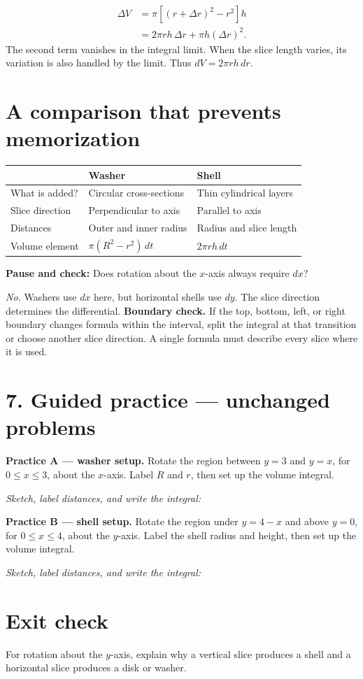 \documentclass[11pt,letterpaper]{article}
\newcommand{\topic}[1]{\section*{#1}}
\newcommand{\pauseq}[1]{\par\textbf{Pause and check:} #1\par}
\begin{document}
\begin{align*}
\Delta V&=\pi[(r+\Delta r)^2-r^2]h\\
 &=2\pi rh\,\Delta r+\pi h(\Delta r)^2.
\end{align*}
The second term vanishes in the integral limit. When the slice length varies, its variation is also handled by the limit. Thus $dV=2\pi rh\,dr$.
\topic{A comparison that prevents memorization}
\begin{center}\begin{tabular}{p{1.15in}p{2.25in}p{2.6in}}\toprule
 & Washer & Shell\\\midrule
What is added? & Circular cross-sections & Thin cylindrical layers\\[5pt]
Slice direction & Perpendicular to axis & Parallel to axis\\[5pt]
Distances & Outer and inner radius & Radius and slice length\\[5pt]
Volume element & $\pi(R^2-r^2)\,dt$ & $2\pi rh\,dt$\\\bottomrule
\end{tabular}\end{center}
\pauseq{Does rotation about the $x$-axis always require $dx$?}
\textit{No.} Washers use $dx$ here, but horizontal shells use $dy$. The slice direction determines the differential.
\textbf{Boundary check.} If the top, bottom, left, or right boundary changes formula within the interval, split the integral at that transition or choose another slice direction. A single formula must describe every slice where it is used.
\newpage
\topic{7. Guided practice --- unchanged problems}
\textbf{Practice A --- washer setup.} Rotate the region between $y=3$ and $y=x$, for $0\leq x\leq3$, about the $x$-axis. Label $R$ and $r$, then set up the volume integral.
\par\vspace{0.1in}
\textit{Sketch, label distances, and write the integral:}\par\vspace{1.1in}
\textbf{Practice B --- shell setup.} Rotate the region under $y=4-x$ and above $y=0$, for $0\leq x\leq4$, about the $y$-axis. Label the shell radius and height, then set up the volume integral.
\par\vspace{0.1in}
\textit{Sketch, label distances, and write the integral:}\par\vspace{1.1in}
\topic{Exit check}
For rotation about the $y$-axis, explain why a vertical slice produces a shell and a horizontal slice produces a disk or washer.
\end{document}
